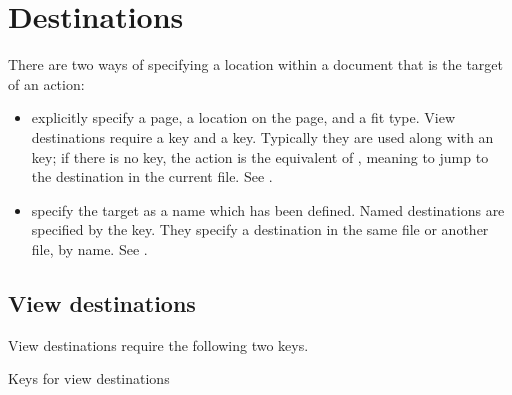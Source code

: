 \documentclass[letterpaper,12pt,english,openany,oneside]{sphinxmanual}
\begin{document}
\section{Destinations}
\label{\detokenize{pdfmark_Actions:destinations}}
There are two ways of specifying a location within a document that is the target of an action:
\begin{itemize}
\item {} 
 explicitly specify a page, a location on the page, and a fit type. View destinations require a  key and a  key. Typically they are used along with an  key; if there is no  key, the action is the equivalent of  , meaning to jump to the destination in the current file. See .

\item {} 
 specify the target as a name which has been defined. Named destinations are specified by the  key. They specify a destination in the same file or another file, by name. See .

\end{itemize}


\subsection{View destinations}
\label{\detokenize{pdfmark_Actions:view-destinations}}
View destinations require the following two keys.

Keys for view destinations
\end{document}
